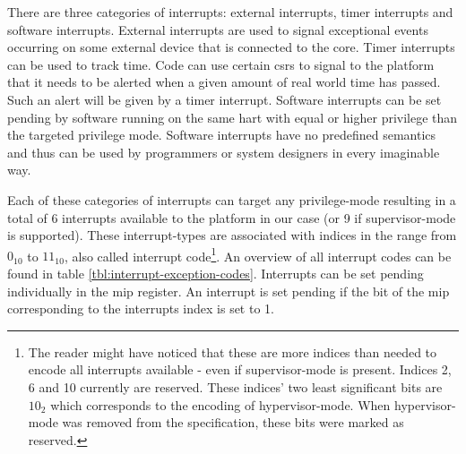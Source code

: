 There are three categories of interrupts: external interrupts, timer interrupts and software interrupts.
External interrupts are used to signal exceptional events occurring on some external device that is connected to the core.
Timer interrupts can be used to track time.
Code can use certain \glspl{csr} to signal to the platform that it needs to be alerted when a given amount of real world time has passed.
Such an alert will be given by a timer interrupt.
Software interrupts can be set pending by software running on the same \gls{hart} with equal or higher privilege than the targeted privilege mode.
Software interrupts have no predefined semantics and thus can be used by programmers or system designers in every imaginable way.

Each of these categories of interrupts can target any privilege-mode resulting in a total of 6 interrupts available to the platform in our case (or 9 if supervisor-mode is supported).
These interrupt-types are associated with indices in the range from $ 0_{10} $ to $ 11_{10} $, also called interrupt code\footnote{%
    The reader might have noticed that these are more indices than needed to encode all interrupts available - even if supervisor-mode is present.
    Indices 2, 6 and 10 currently are reserved.
    These indices' two least significant bits are $ 10_2 $ which corresponds to the encoding of hypervisor-mode.
    When hypervisor-mode was removed from the specification, these bits were marked as reserved.
}.
An overview of all interrupt codes can be found in table \ref{tbl:interrupt-exception-codes}.
Interrupts can be set pending individually in the \gls{mip} register.
An interrupt is set pending if the bit of the \gls{mip} corresponding to the interrupts index is set to 1.

